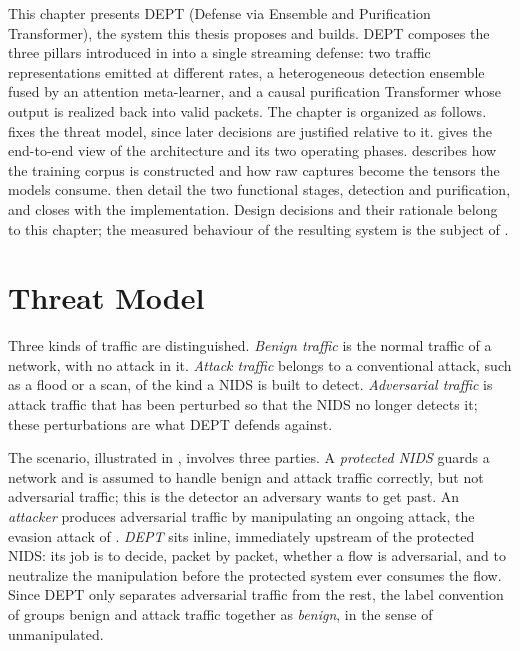 \label{chap:solution}

This chapter presents DEPT (Defense via Ensemble and Purification Transformer), the
system this thesis proposes and builds. DEPT composes the three pillars introduced in
 into a single streaming defense: two traffic representations
emitted at different rates, a heterogeneous detection ensemble fused by an attention
meta-learner, and a causal purification Transformer whose output is realized back into
valid packets. The chapter is organized as follows.
 fixes the threat model, since later decisions are
justified relative to it.  gives the end-to-end view of the
architecture and its two operating phases.  describes how the
training corpus is constructed and how raw captures become the tensors the models
consume.  then detail the two functional
stages, detection and purification, and  closes with the
implementation. Design decisions and their rationale belong to this chapter; the
measured behaviour of the resulting system is the subject of .

\section{Threat Model}\label{sec:sol-threat}
Three kinds of traffic are distinguished. \emph{Benign traffic} is the normal traffic of
a network, with no attack in it. \emph{Attack traffic} belongs to a conventional attack,
such as a flood or a scan, of the kind a \ac{NIDS} is built to detect.
\emph{Adversarial traffic} is attack traffic that has been perturbed so that the
\ac{NIDS} no longer detects it; these perturbations are what DEPT defends against.

The scenario, illustrated in , involves three parties. A
\emph{protected \ac{NIDS}} guards a network and is assumed to handle benign and attack
traffic correctly, but not adversarial traffic; this is the detector an adversary wants
to get past. An \emph{attacker} produces adversarial traffic by manipulating an ongoing
attack, the evasion attack of . \emph{DEPT} sits inline, immediately
upstream of the protected \ac{NIDS}: its job is to decide, packet by packet, whether a
flow is adversarial, and to neutralize the manipulation before the protected system
ever consumes the flow. Since DEPT only separates adversarial traffic from the rest, the
label convention of  groups benign and attack traffic together
as \emph{benign}, in the sense of unmanipulated.

